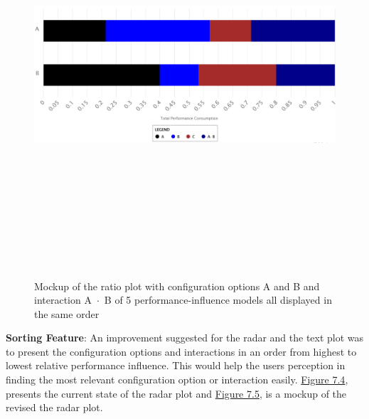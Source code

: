 \begin{myindentpar}{0cm}
\begin{figure}[ht]
\centering
\label{sameOrderAfter}
\includegraphics[width=15cm,height=15cm,keepaspectratio,]{pics/ratio_plot_without_sorted_order_after.pdf}
\caption[Ratio plot without sort functionality]{Mockup of the ratio plot with configuration options A and B and interaction \mbox{A $\cdot$ B} of 5 performance-influence models all displayed in the same order}
\end{figure}

\textbf{Sorting Feature}: An improvement suggested for the radar and the text plot was to present the configuration options and interactions in an order from highest to lowest relative performance influence. This would help the users perception in finding the most relevant configuration option or interaction easily. \hyperref[relevanceBefore]{Figure 7.4}, presents the current state of the radar plot and \hyperref[relevanceAfter]{Figure 7.5}, is a mockup of the revised the radar plot.


\end{myindentpar}
